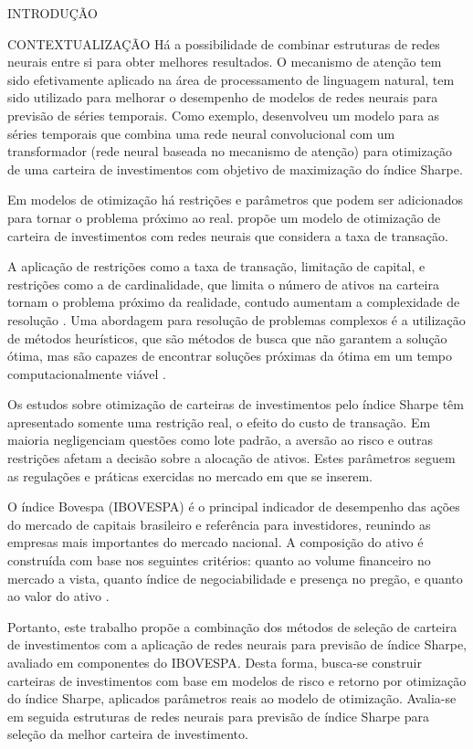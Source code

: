 \begin{section}{INTRODUÇÃO}
\begin{subsection}{CONTEXTUALIZAÇÃO}
        \ipar Há a possibilidade de combinar estruturas de redes neurais entre si para obter melhores resultados. O mecanismo de atenção tem sido efetivamente aplicado na área de processamento de linguagem natural, tem sido utilizado para melhorar o desempenho de modelos de redes neurais para previsão de séries temporais. Como exemplo,  desenvolveu um modelo para as séries temporais que combina uma rede neural convolucional com um transformador (rede neural baseada no mecanismo de atenção) para otimização de uma carteira de investimentos com objetivo de maximização do índice Sharpe.

        \ipar Em modelos de otimização há restrições e parâmetros que podem ser adicionados para tornar o problema próximo ao real.  propõe um modelo de otimização de carteira de investimentos com redes neurais que considera a taxa de transação. 
        
        \ipar A aplicação de restrições como a taxa de transação, limitação de capital, e restrições como a de cardinalidade, que limita o número de ativos na carteira tornam o problema próximo da realidade, contudo aumentam a complexidade de resolução \cite{aithal2023real}. Uma abordagem para resolução de problemas complexos é a utilização de métodos heurísticos, que são métodos de busca que não garantem a solução ótima, mas são capazes de encontrar soluções próximas da ótima em um tempo computacionalmente viável \cite{milhomem2020analysis}.

        \ipar Os estudos sobre otimização de carteiras de investimentos pelo índice Sharpe têm apresentado somente uma restrição real, o efeito do custo de transação. Em maioria negligenciam questões como lote padrão, a aversão ao risco e outras restrições afetam a decisão sobre a alocação de ativos. Estes parâmetros seguem as regulações e práticas exercidas no mercado em que se inserem.

        \ipar O índice Bovespa (\acrshort{IBOVESPA}) é o principal indicador de desempenho das ações do mercado de capitais brasileiro e referência para investidores, reunindo as empresas mais importantes do mercado nacional. A composição do ativo é construída com base nos seguintes critérios: quanto ao volume financeiro no mercado a vista, quanto índice de negociabilidade e presença no pregão, e quanto ao valor do ativo \cite{B32023}. 

        \ipar Portanto, este trabalho propõe a combinação dos métodos de seleção de carteira de investimentos com a aplicação de redes neurais para previsão de índice Sharpe, avaliado em componentes do \acrshort{IBOVESPA}. Desta forma, busca-se construir carteiras de investimentos com base em modelos de risco e retorno por otimização do índice Sharpe, aplicados parâmetros reais ao modelo de otimização. Avalia-se em seguida estruturas de redes neurais para previsão de índice Sharpe para seleção da melhor carteira de investimento.


\end{subsection}
\end{section}
